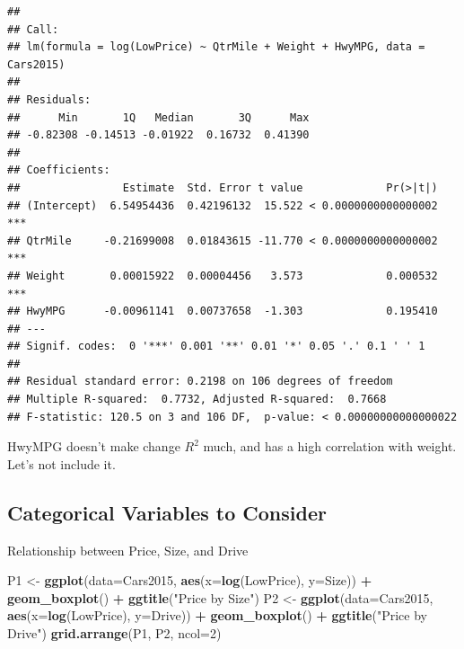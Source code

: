 \documentclass[]{book}
\newenvironment{Shaded}{\begin{snugshade}}{\end{snugshade}}
\newcommand{\KeywordTok}[1]{\textcolor[rgb]{0.13,0.29,0.53}{\textbf{#1}}}
\newcommand{\DataTypeTok}[1]{\textcolor[rgb]{0.13,0.29,0.53}{#1}}
\newcommand{\DecValTok}[1]{\textcolor[rgb]{0.00,0.00,0.81}{#1}}
\newcommand{\StringTok}[1]{\textcolor[rgb]{0.31,0.60,0.02}{#1}}
\newcommand{\OperatorTok}[1]{\textcolor[rgb]{0.81,0.36,0.00}{\textbf{#1}}}
\newcommand{\NormalTok}[1]{#1}
\begin{document}
\begin{verbatim}
## 
## Call:
## lm(formula = log(LowPrice) ~ QtrMile + Weight + HwyMPG, data = Cars2015)
## 
## Residuals:
##      Min       1Q   Median       3Q      Max 
## -0.82308 -0.14513 -0.01922  0.16732  0.41390 
## 
## Coefficients:
##                Estimate  Std. Error t value             Pr(>|t|)    
## (Intercept)  6.54954436  0.42196132  15.522 < 0.0000000000000002 ***
## QtrMile     -0.21699008  0.01843615 -11.770 < 0.0000000000000002 ***
## Weight       0.00015922  0.00004456   3.573             0.000532 ***
## HwyMPG      -0.00961141  0.00737658  -1.303             0.195410    
## ---
## Signif. codes:  0 '***' 0.001 '**' 0.01 '*' 0.05 '.' 0.1 ' ' 1
## 
## Residual standard error: 0.2198 on 106 degrees of freedom
## Multiple R-squared:  0.7732, Adjusted R-squared:  0.7668 
## F-statistic: 120.5 on 3 and 106 DF,  p-value: < 0.00000000000000022
\end{verbatim}

HwyMPG doesn't make change \(R^2\) much, and has a high correlation with
weight. Let's not include it.

\subsection{Categorical Variables to
Consider}\label{categorical-variables-to-consider}

Relationship between Price, Size, and Drive

\begin{Shaded}
\begin{Highlighting}[]
\NormalTok{P1 <-}\StringTok{ }\KeywordTok{ggplot}\NormalTok{(}\DataTypeTok{data=}\NormalTok{Cars2015, }\KeywordTok{aes}\NormalTok{(}\DataTypeTok{x=}\KeywordTok{log}\NormalTok{(LowPrice), }\DataTypeTok{y=}\NormalTok{Size)) }\OperatorTok{+}\StringTok{ }\KeywordTok{geom_boxplot}\NormalTok{() }\OperatorTok{+}\StringTok{ }\KeywordTok{ggtitle}\NormalTok{(}\StringTok{"Price by Size"}\NormalTok{)}
\NormalTok{P2 <-}\StringTok{ }\KeywordTok{ggplot}\NormalTok{(}\DataTypeTok{data=}\NormalTok{Cars2015, }\KeywordTok{aes}\NormalTok{(}\DataTypeTok{x=}\KeywordTok{log}\NormalTok{(LowPrice), }\DataTypeTok{y=}\NormalTok{Drive)) }\OperatorTok{+}\StringTok{ }\KeywordTok{geom_boxplot}\NormalTok{() }\OperatorTok{+}\StringTok{ }\KeywordTok{ggtitle}\NormalTok{(}\StringTok{"Price by Drive"}\NormalTok{)}
\KeywordTok{grid.arrange}\NormalTok{(P1, P2, }\DataTypeTok{ncol=}\DecValTok{2}\NormalTok{)}
\end{Highlighting}
\end{Shaded}
\end{document}
